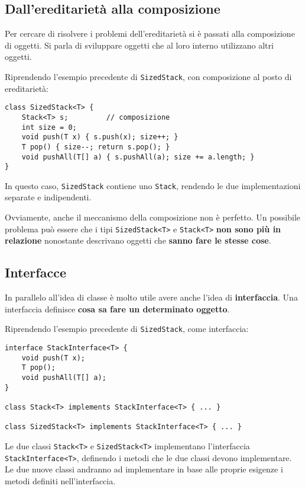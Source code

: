 \documentclass{article}
\begin{document}
\subsection*{Dall'ereditarietà alla composizione}
Per cercare di risolvere i problemi dell'ereditarietà si è passati alla composizione di oggetti. Si parla di sviluppare oggetti che al loro interno utilizzano altri oggetti.

Riprendendo l'esempio precedente di \texttt{SizedStack}, con composizione al posto di ereditarietà:
\begin{tcolorbox}
\begin{verbatim}
class SizedStack<T> {
    Stack<T> s;         // composizione
    int size = 0;
    void push(T x) { s.push(x); size++; }
    T pop() { size--; return s.pop(); }
    void pushAll(T[] a) { s.pushAll(a); size += a.length; }
}
\end{verbatim}
\end{tcolorbox}
In questo caso, \texttt{SizedStack} contiene uno \texttt{Stack}, rendendo le due implementazioni separate e indipendenti.

Ovviamente, anche il meccanismo della composizione non è perfetto. Un possibile problema può essere che i tipi \texttt{SizedStack<T>} e \texttt{Stack<T>} \textbf{non sono più in relazione} nonostante descrivano oggetti che \textbf{sanno fare le stesse cose}.

\pagebreak

\subsection*{Interfacce}
In parallelo all'idea di classe è molto utile avere anche l'idea di \textbf{interfaccia}. Una interfaccia definisce \textbf{cosa sa fare un determinato oggetto}.

Riprendendo l'esempio precedente di \texttt{SizedStack}, come interfaccia:
\begin{tcolorbox}
\begin{verbatim}
interface StackInterface<T> {
    void push(T x);
    T pop();
    void pushAll(T[] a);
}

class Stack<T> implements StackInterface<T> { ... }

class SizedStack<T> implements StackInterface<T> { ... }
\end{verbatim}
\end{tcolorbox}
Le due classi \texttt{Stack<T>} e \texttt{SizedStack<T>} implementano l'interfaccia \texttt{StackInterface<T>}, definendo i metodi che le due classi devono implementare. Le due nuove classi andranno ad implementare in base alle proprie esigenze i metodi definiti nell'interfaccia.
\end{document}

